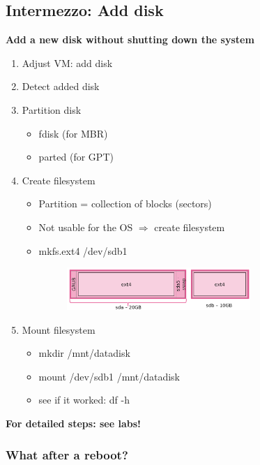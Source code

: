 \documentclass{article}
\begin{document}
\subsection{Intermezzo: Add disk}

\textbf{Add a new disk without shutting down the system}

\begin{enumerate}
    \item Adjust VM: add disk
    \item Detect added disk
    \item Partition disk
    \begin{itemize}
        \item fdisk (for MBR)
        \item parted (for GPT)
    \end{itemize}
    \item Create filesystem
    \begin{itemize}
        \item Partition = collection of blocks (sectors)
        \item Not usable for the OS $\Rightarrow$ create filesystem
        \item mkfs.ext4 /dev/sdb1
        \begin{figure}[H]
            \centering
            \includegraphics[width=0.7\textwidth]{create-filesystem.png}
        \end{figure}
    \end{itemize}
    \item Mount filesystem
    \begin{itemize}
        \item mkdir /mnt/datadisk
        \item mount /dev/sdb1 /mnt/datadisk
        \item see if it worked: df -h
    \end{itemize}
\end{enumerate}

\textbf{For detailed steps: see labs!}


\subsubsection{What after a reboot?}
\end{document}
